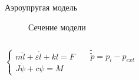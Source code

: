 \documentclass[ignoreonframetext,unicode]{beamer}
\begin{document}
\begin{frame}{Аэроупругая модель}
	\vspace*{-9mm}
	\begin{figure}[!htbp]
		\caption{Сечение модели}
		\label{pruzina}
	\end{figure}	

\vspace*{-5mm}
	\begin{columns}
			\begin{block}{}
				\vspace*{-1mm}
			\begin{equation*}
				\begin{cases*}
					m \ddot{l} + \varepsilon \dot{l} + k l  = F \\
					J \ddot{\psi} + c \psi = M
				\end{cases*}
				\label{lagrsdfdsfsange_fin}
			\end{equation*}
		\end{block}
		\column{0.5\textwidth}
		\begin{block}{}
			\begin{equation*}
				\tilde{\tilde{p}} = p_i - p_{ext}
			\end{equation*}
		\end{block}
	\end{columns}
	

\end{frame}
\end{document}
